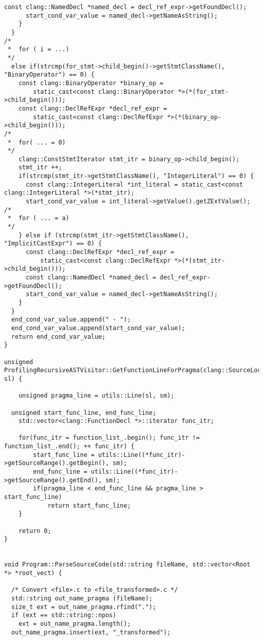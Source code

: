 \documentclass[a4paper,10pt,twoside]{book}
\begin{document}
\begin{lstlisting}[language=CCC, caption=driver/program.cpp]
      const clang::NamedDecl *named_decl = decl_ref_expr->getFoundDecl();
      start_cond_var_value = named_decl->getNameAsString();
    }
  }
/*
 *  for ( i = ...)
 */
  else if(strcmp(for_stmt->child_begin()->getStmtClassName(), "BinaryOperator") == 0) {
    const clang::BinaryOperator *binary_op = 
        static_cast<const clang::BinaryOperator *>(*(for_stmt->child_begin())); 
    const clang::DeclRefExpr *decl_ref_expr = 
        static_cast<const clang::DeclRefExpr *>(*(binary_op->child_begin()));
/*
 *  for( ... = 0)
 */
    clang::ConstStmtIterator stmt_itr = binary_op->child_begin();
    stmt_itr ++;
    if(strcmp(stmt_itr->getStmtClassName(), "IntegerLiteral") == 0) {
      const clang::IntegerLiteral *int_literal = static_cast<const clang::IntegerLiteral *>(*stmt_itr);
      start_cond_var_value = int_literal->getValue().getZExtValue();      
/*
 *  for ( ... = a)
 */
    } else if (strcmp(stmt_itr->getStmtClassName(), "ImplicitCastExpr") == 0) {
      const clang::DeclRefExpr *decl_ref_expr = 
          static_cast<const clang::DeclRefExpr *>(*(stmt_itr->child_begin()));
      const clang::NamedDecl *named_decl = decl_ref_expr->getFoundDecl();
      start_cond_var_value = named_decl->getNameAsString();
    }
  }
  end_cond_var_value.append(" - ");
  end_cond_var_value.append(start_cond_var_value);
  return end_cond_var_value;
}

unsigned ProfilingRecursiveASTVisitor::GetFunctionLineForPragma(clang::SourceLocation sl) {

	unsigned pragma_line = utils::Line(sl, sm);

  unsigned start_func_line, end_func_line;
	std::vector<clang::FunctionDecl *>::iterator func_itr;

	for(func_itr = function_list_.begin(); func_itr != function_list_.end(); ++ func_itr) {
		start_func_line = utils::Line((*func_itr)->getSourceRange().getBegin(), sm);
		end_func_line = utils::Line((*func_itr)->getSourceRange().getEnd(), sm);
		if(pragma_line < end_func_line && pragma_line > start_func_line)
			return start_func_line;
	}

	return 0;
}


void Program::ParseSourceCode(std::string fileName, std::vector<Root *> *root_vect) {

  /* Convert <file>.c to <file_transformed>.c */
  std::string out_name_pragma (fileName);
  size_t ext = out_name_pragma.rfind(".");
  if (ext == std::string::npos)
    ext = out_name_pragma.length();
  out_name_pragma.insert(ext, "_transformed");


\end{lstlisting}
\end{document}
